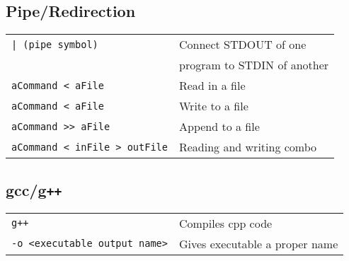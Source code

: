\documentclass[14pt,landscape]{extarticle}
\begin{document}
\begin{multicols}{2}
\subsection{Pipe/Redirection}
\begin{tabular}{@{}ll@{}}
\verb!| (pipe symbol)!    & Connect STDOUT of one \\
\verb!!   & program to STDIN of another \\
\verb!aCommand < aFile!  & Read in a file \\
\verb!aCommand < aFile!  & Write to a file \\
\verb!aCommand >> aFile!  & Append to a file \\
\verb!aCommand < inFile > outFile!  & Reading and writing combo 
\end{tabular}

\subsection{gcc/g{}\texttt{++}}
\begin{tabular}{@{}ll@{}}
\verb!g++!  & Compiles cpp code \\
 \verb!-o <executable output name>!  & Gives executable a proper name \\
\end{tabular}
\end{multicols}
\end{document}
